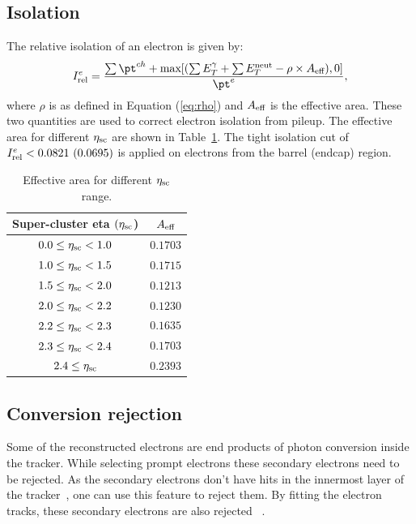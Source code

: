 \subsection{Isolation}
\label{s:ele_iso}
The relative isolation of an electron is given by:
\begin{equation}
\label{eq:ele_iso}
I_{\rm {rel}}^e= \frac{\sum\pt^{ch}+{\rm {max}}[(\sum E_T^\gamma+\sum E_T^{\rm {neut}}-\rho\times A_{\rm {eff}}),0]}{\pt^e},
\end{equation}
where $\rho$ is as defined in Equation (\ref{eq:rho}) and $A_{\rm {eff}}$ is the 
effective area. These two quantities are used to correct electron isolation from 
pileup. The effective area for different $\eta_{\rm {sc}}$ are shown in 
Table~\ref{tab:EA}. The tight isolation cut of $I_{\rm {rel}}^e < 0.0821 ~(0.0695)$ 
is applied on electrons from the barrel (endcap) region.
\begin{table}
 \caption{Effective area for different $\eta_{\rm {sc}}$ range.}
 \begin{center}
 \begin{tabular}{cc}\hline\hline
     Super-cluster eta $(\eta_{\rm {sc}}$) & $A_{\rm {eff}}$ \\ \hline\hline
     $0.0 \leq \eta_{\rm {sc}} < 1.0 $ & $0.1703$ \\
     $1.0 \leq \eta_{\rm {sc}} < 1.5 $ & $0.1715$ \\
     $1.5 \leq \eta_{\rm {sc}} < 2.0 $ & $0.1213$ \\
     $2.0 \leq \eta_{\rm {sc}} < 2.2 $ & $0.1230$ \\
     $2.2 \leq \eta_{\rm {sc}} < 2.3 $ & $0.1635$ \\
     $2.3 \leq \eta_{\rm {sc}} < 2.4 $ & $0.1703$ \\
     $2.4 \leq \eta_{\rm {sc}} $ & $0.2393$ \\\hline
 \end{tabular}
 \end{center}
 \label{tab:EA}
 \end{table}

\subsection{Conversion rejection}
\label{s:ele_conv_rej}
Some of the reconstructed electrons are end products of photon conversion inside the tracker.
While selecting prompt electrons these secondary electrons need to be rejected.
As the secondary electrons don't have hits in the innermost layer of the tracker~\cite{Khachatryan:2015hwa},
one can use this feature to reject them.
By fitting the electron tracks, these secondary electrons are also rejected ~\cite{Khachatryan:2015hwa}.

